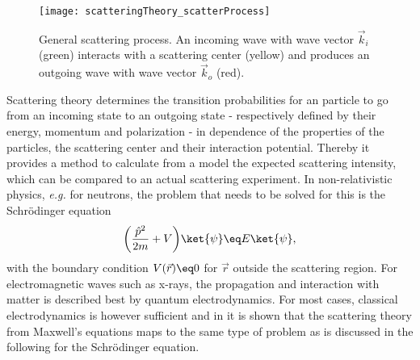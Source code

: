 \documentclass[\main/dresen_thesis.tex]{subfiles}
\begin{document}
\begin{figure}[tb]
  \centering
  \texttt{[image: scatteringTheory\_scatterProcess]}
  \caption{\label{fig:theoreticalBackground:scattering:scatteringTheory:scatteringProcess}General scattering process. An incoming wave with wave vector $\vec{k}_i$ (green) interacts with a scattering center (yellow) and produces an outgoing wave with wave vector $\vec{k}_o$ (red).}
\end{figure}

Scattering theory determines the transition probabilities for an particle to go from an incoming state to an outgoing state - respectively defined by their energy, momentum and polarization - in dependence of the properties of the particles, the scattering center and their interaction potential.
Thereby it provides a method to calculate from a model the expected scattering intensity, which can be compared to an actual scattering experiment.
In non-relativistic physics, \textit{e.g.} for neutrons, the problem that needs to be solved for this is the Schr\"odinger equation
\begin{align}
  \label{eq:theoreticalBackground:scattering:scatteringTheory:schrodingerEquation}
  \bigg(\frac{\hat{p}^2}{2m} + V \bigg) \ket{\psi} \eq E \ket{\psi},
\end{align}
with the boundary condition $V(\vec{r}) \eq 0$ for $\vec{r}$ outside the scattering region.
For electromagnetic waves such as x-rays, the propagation and interaction with matter is described best by quantum electrodynamics.
For most cases, classical electrodynamics is however sufficient and in  it is shown that the scattering theory from Maxwell's equations maps to the same type of problem as is discussed in the following for the Schr\"odinger equation.
\end{document}
